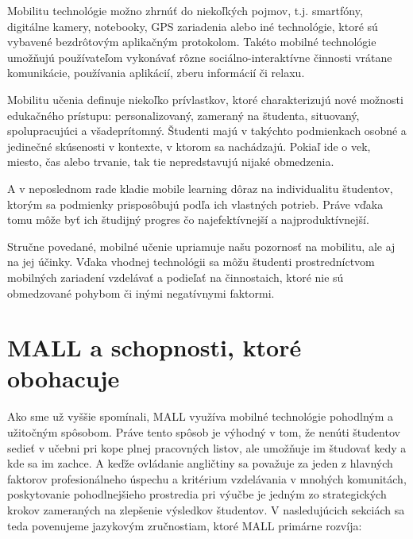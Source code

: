 \documentclass[10pt,oneside,slovak,a4paper]{article}
\begin{document}
Mobilitu technológie možno zhrnúť do niekoľkých pojmov, t.j. smartfóny, digitálne kamery, notebooky, GPS zariadenia alebo iné technológie, ktoré sú vybavené bezdrôtovým aplikačným protokolom. Takéto mobilné technológie umožňujú používateľom vykonávať rôzne sociálno-interaktívne činnosti vrátane komunikácie, používania aplikácií, zberu informácií či relaxu\cite{Kim2012}.

Mobilitu učenia definuje niekoľko prívlastkov, ktoré charakterizujú nové možnosti edukačného prístupu: personalizovaný, zameraný na študenta, situovaný, spolupracujúci a všadeprítomný. Študenti majú v takýchto podmienkach osobné a jedinečné skúsenosti v kontexte, v ktorom sa nachádzajú. Pokiaľ ide o vek, miesto, čas alebo trvanie, tak tie nepredstavujú nijaké obmedzenia\cite{Kim2012}. 

A v neposlednom rade kladie mobile learning dôraz na individualitu študentov, ktorým sa podmienky prisposôbujú podľa ich vlastných potrieb. Práve vďaka tomu môže byť ich študijný progres čo najefektívnejší a najproduktívnejší.

Stručne povedané, mobilné učenie upriamuje našu pozornosť na mobilitu, ale aj na jej účinky. Vďaka vhodnej technológii sa môžu študenti prostredníctvom mobilných zariadení vzdelávať a podieľať na činnostaich, ktoré nie sú obmedzované pohybom či inými negatívnymi faktormi.



\section{MALL a schopnosti, ktoré obohacuje} \label{mall}

Ako sme už vyššie spomínali, MALL využíva mobilné technológie pohodlným a užitočným spôsobom. Práve tento spôsob je výhodný v tom, že nenúti študentov sedieť v učebni pri kope plnej pracovných listov, ale umožňuje im študovať kedy a kde sa im zachce. A keďže ovládanie angličtiny sa považuje za jeden z hlavných faktorov profesionálneho úspechu a kritérium vzdelávania v mnohých komunitách, poskytovanie pohodlnejšieho prostredia pri výučbe je jedným zo strategických krokov zameraných na zlepšenie výsledkov študentov\cite{Miangah2012}. V nasledujúcich sekciách sa teda povenujeme jazykovým zručnostiam, ktoré MALL primárne rozvíja:
\end{document}
